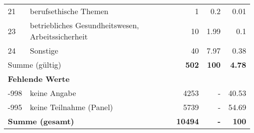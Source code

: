 \begin{longtable}{lXrrr}
        21 & \multicolumn{1}{X}{berufsethische Themen} & %
          \num{1} &
          \num[round-mode=places,round-precision=2]{0,2} &
          \num[round-mode=places,round-precision=2]{0,01} \\

        23 & \multicolumn{1}{X}{betriebliches Gesundheitswesen, Arbeitssicherheit} & %
          \num{10} &
          \num[round-mode=places,round-precision=2]{1,99} &
          \num[round-mode=places,round-precision=2]{0,1} \\

        24 & \multicolumn{1}{X}{Sonstige} & %
          \num{40} &
          \num[round-mode=places,round-precision=2]{7,97} &
          \num[round-mode=places,round-precision=2]{0,38} \\

     \midrule
     \multicolumn{2}{l}{Summe (gültig)} &
       \textbf{\num{502}} &
     \textbf{100} &
       \textbf{\num[round-mode=places,round-precision=2]{4,78}} \\
     \multicolumn{5}{l}{\textbf{Fehlende Werte}}\\
       -998 &
       keine Angabe &
         \num{4253} &
        - &
         \num[round-mode=places,round-precision=2]{40,53} \\
       -995 &
       keine Teilnahme (Panel) &
         \num{5739} &
        - &
         \num[round-mode=places,round-precision=2]{54,69} \\
     \midrule
     \multicolumn{2}{l}{\textbf{Summe (gesamt)}} &
          \textbf{\num{10494}} &
        \textbf{-} &
        \textbf{100} \\
     \bottomrule
     \end{longtable}
     
